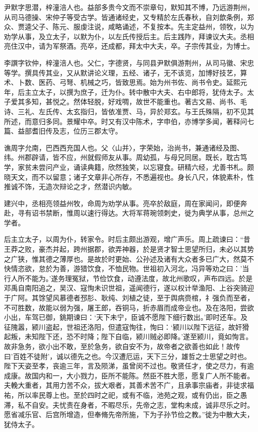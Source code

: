 \documentclass[12pt,UTF8]{ctexbook}
\begin{document}
尹默字思潜，梓潼涪人也。益部多贵今文而不崇章句，默知其不博，乃远游荆州，从司马德操、宋仲子等受古学。皆通诸经史，又专精於左氏春秋，自刘歆条例，郑众、贾逵父子、陈元、服虔注说，咸略诵述，不复按本。先主定益州，领牧，以为劝学从事，及立太子，以默为仆，以左氏传授后主。后主践阼，拜谏议大夫。丞相亮住汉中，请为军祭酒。亮卒，还成都，拜太中大夫，卒。子宗传其业，为博士。

李譔字钦仲，梓潼涪人也。父仁，字德贤，与同县尹默俱游荆州，从司马徽、宋忠等学。撰具传其业，又从默讲论义理，五经、诸子，无不该览，加博好技艺，算术、卜数、医药、弓弩、机械之巧，皆致思焉。始为州书佐、尚书令史。延熙元年，后主立太子，以撰为庶子，迁为仆。转中散中大夫、右中郎将，犹侍太子。太子爱其多知，甚悦之。然体轻脱，好戏啁，故世不能重也。著古文易、尚书、毛诗、三礼、左氏传、太玄指归，皆依准贾、马，异於郑玄。与王氏殊隔，初不见其所述，而意归多同。景耀中卒。时又有汉中陈术，字申伯，亦博学多闻，著释问七篇、益部耆旧传及志，位历三郡太守。

谯周字允南，巴西西充国人也。父〈山并〉，字荣始，治尚书，兼通诸经及图、纬。州郡辟请，皆不应，州就假师友从事。周幼孤，与母兄同居。既长，耽古笃学，家贫未尝问产业，诵读典籍，欣然独笑，以忘寝食。研精六经，尤善书札。颇晓天文，而不以留意；诸子文章非心所存，不悉遍视也。身长八尺，体貌素朴，性推诚不饰，无造次辩论之才，然潜识内敏。

建兴中，丞相亮领益州牧，命周为劝学从事。亮卒於敌庭，周在家闻问，即便奔赴，寻有诏书禁断，惟周以速行得达。大将军蒋琬领刺史，徙为典学从事，总州之学者。

后主立太子，以周为仆，转家令。时后主颇出游观，增广声乐。周上疏谏曰：“昔王莽之败，豪杰并起，跨州据郡，欲弄神器，於是贤才智士思望所归，未必以其势之广狭，惟其德之薄厚也。是故於时更始、公孙述及诸有大众者多已广大，然莫不快情恣欲，怠於为善，游猎饮食，不恤民物。世祖初入河北，冯异等劝之曰：'当行人所不能为。'遂务理冤狱，节俭饮食，动遵法度，故北州歌叹，声布四远。於是邓禹自南阳追之，吴汉、寇恂未识世祖，遥闻德行，遂以权计举渔阳、上谷突骑迎于广阿。其馀望风慕德者邳肜、耿纯、刘植之徒，至于舆病赍棺，礻强负而至者，不可胜数，故能以弱为强，屠王郎，吞铜马，折赤眉而成帝业也。及在洛阳，尝欲小出，车驾已御，銚期谏曰：‘天下未宁，臣诚不愿陛下细行数出。’即时还车。及征隗嚣，颍川盗起，世祖还洛阳，但遣寇恂往，恂曰：‘颍川以陛下远征，故奸猾起叛，未知陛下还，恐不时降；陛下自临，颍川贼必即降。'遂至颍川，竟如恂言。故非急务，欲小出不敢，至於急务，欲自安不为，故帝者之欲善也如此！故传曰'百姓不徒附'，诚以德先之也。今汉遭厄运，天下三分，雄哲之士思望之时也。陛下天姿至孝，丧逾三年，言及陨涕，虽曾闵不过也。敬贤任才，使之尽力，有逾成康。故国内和一，大小戮力，臣所不能陈。然臣不胜大愿，愿复广人所不能者。夫輓大重者，其用力苦不众，拔大艰者，其善术苦不广，且承事宗庙者，非徒求福祐，所以率民尊上也。至於四时之祀，或有不临，池苑之观，或有仍出，臣之愚滞，私不自安。夫忧责在身者，不暇尽乐，先帝之志，堂构未成，诚非尽乐之时。愿省减乐官、后宫所增造，但奉脩先帝所施，下为子孙节俭之教。”徙为中散大夫，犹侍太子。
\end{document}
